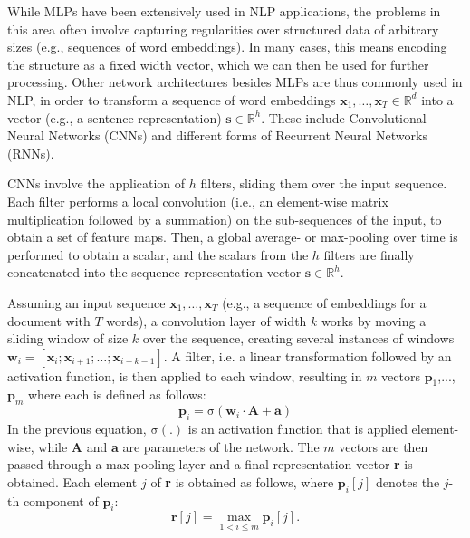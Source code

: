 While MLPs have been extensively used in NLP applications, the problems in this area often involve capturing regularities over structured data of arbitrary sizes (e.g., sequences of word embeddings). In many cases, this means encoding the structure as a fixed width vector, which we can then be used for further processing. Other network architectures besides MLPs are thus commonly used in NLP, in order to transform a sequence of word embeddings $\boldsymbol{x}_1, \ldots , \boldsymbol{x}_T \in \mathbb{R}^d$ into a vector (e.g., a sentence representation) $\boldsymbol{s} \in \mathbb{R}^h$. These include Convolutional Neural Networks (CNNs) and different forms of Recurrent Neural Networks (RNNs).

CNNs involve the application of $h$ filters, sliding them over the input sequence. Each filter performs a local convolution (i.e., an element-wise matrix multiplication followed by a summation) on the sub-sequences of the input, to obtain a set of feature maps. Then, a global average- or max-pooling over time is performed to obtain a scalar, and the scalars from the $h$ filters are finally concatenated into the sequence representation vector $\boldsymbol{s} \in \mathbb{R}^h$.

Assuming an input sequence $\boldsymbol{x}_1,\ldots,\boldsymbol{x}_T$ (e.g., a sequence of embeddings for a document with $T$ words), a convolution layer of width $k$ works by moving a sliding window of size $k$ over the sequence, creating several instances of windows $\boldsymbol{w}_i=[\boldsymbol{x}_i;\boldsymbol{x}_{i+1};\ldots;\boldsymbol{x}_{i+k-1}]$. A filter, i.e. a linear transformation followed by an activation function, is then applied to each window, resulting in $m$ vectors $\boldsymbol{p}_1$,..., $\boldsymbol{p}_m$ where each is defined as follows:
\begin{equation}
\boldsymbol{p}_i = \mathrm{\sigma}(\boldsymbol{w}_i \cdot \boldsymbol{A} + \boldsymbol{a})
\label{eq:conv}
\end{equation}
In the previous equation, $\mathrm{\sigma(.)}$ is an activation function that is applied element-wise, while \textbf{A} and \textbf{a} are parameters of the network. The $m$ vectors are then passed through a max-pooling layer and a final representation vector \textbf{r} is obtained. Each element $j$ of \textbf{r} is obtained as follows, where $\boldsymbol{p}_i[j]$ denotes the $j$-th component of $\boldsymbol{p}_i$: 
\begin{equation}
\boldsymbol{r}[j] = \max_{1 < i \leq m} \boldsymbol{p}_i[j].
\label{eq:maxpool}
\end{equation}


